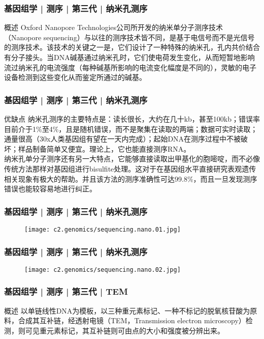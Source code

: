 \begin{frame}
  \frametitle{基因组学 | 测序 | 第三代 | 纳米孔测序}
  \begin{block}{概述}
Oxford Nanopore Technologies公司所开发的纳米单分子测序技术（Nanopore sequencing）与以往的测序技术皆不同，是基于电信号而不是光信号的测序技术。该技术的关键之一是，它们设计了一种特殊的纳米孔，孔内共价结合有分子接头。当DNA碱基通过纳米孔时，它们使电荷发生变化，从而短暂地影响流过纳米孔的电流强度（每种碱基所影响的电流变化幅度是不同的），灵敏的电子设备检测到这些变化从而鉴定所通过的碱基。
  \end{block}
\end{frame}

\begin{frame}
  \frametitle{基因组学 | 测序 | 第三代 | 纳米孔测序}
  \begin{block}{优缺点}
纳米孔测序的主要特点是：读长很长，大约在几十kb，甚至100kb；错误率目前介于1\%至4\%，且是随机错误，而不是聚集在读取的两端；数据可实时读取；通量很高（30x人类基因组有望在一天内完成）；起始DNA在测序过程中不被破坏；样品制备简单又便宜。理论上，它也能直接测序RNA。\\
\vspace{1em}
纳米孔单分子测序还有另一大特点，它能够直接读取出甲基化的胞嘧啶，而不必像传统方法那样对基因组进行bisulfite处理。这对于在基因组水平直接研究表观遗传相关现象有极大的帮助。并且该方法的测序准确性可达99.8\%，而且一旦发现测序错误也能较容易地进行纠正。
  \end{block}
\end{frame}

\begin{frame}
  \frametitle{基因组学 | 测序 | 第三代 | 纳米孔测序}
  \begin{figure}
    \centering
    \texttt{[image: c2.genomics/sequencing.nano.01.jpg]}
  \end{figure}
\end{frame}

\begin{frame}
  \frametitle{基因组学 | 测序 | 第三代 | 纳米孔测序}
  \begin{figure}
    \centering
    \texttt{[image: c2.genomics/sequencing.nano.02.jpg]}
  \end{figure}
\end{frame}

\begin{frame}
  \frametitle{基因组学 | 测序 | 第三代 | TEM}
  \begin{block}{概述}
以单链线性DNA为模板，以三种重元素标记、一种不标记的脱氧核苷酸为原料，合成其互补链，经透射电镜（TEM，Transmission electron microscopy）检测，则可见重元素标记，其互补链则可由点的大小和强度被分辨出来。
  \end{block}
\end{frame}

